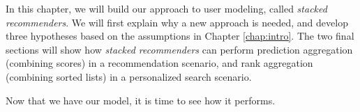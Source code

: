 \label{chap:methods}

In this chapter, we will build our approach to user modeling,
called \emph{stacked recommenders}.
We will first explain why a new approach is needed,
and develop three hypotheses based on the 
assumptions in Chapter \ref{chap:intro}.
The two final sections will show how \emph{stacked recommenders}
can perform prediction aggregation (combining scores) in a recommendation scenario,
and rank aggregation (combining sorted lists) in a personalized search scenario.







Now that we have our model,
it is time to see how it performs.

%
